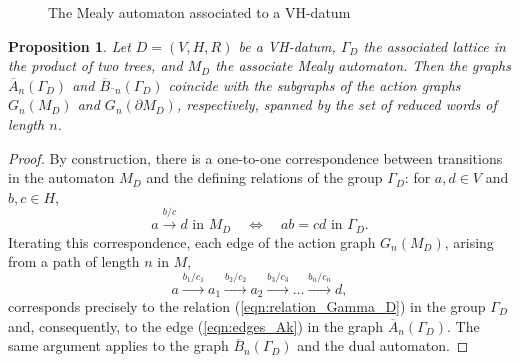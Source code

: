 \documentclass[12pt]{article}
\newtheorem{proposition}[theorem]{Proposition}
\theoremstyle{definition}
\begin{document}
\begin{figure}[t]
\begin{center}
\end{center}
\caption{The Mealy automaton associated to a VH-datum}\label{fig:Mealy_VHdatum}
\end{figure}

\begin{proposition}
Let $D=(V,H,R)$ be a VH-datum, $\Gamma_D$ the associated lattice in the product of two trees, and $M_D$ the associate Mealy automaton.
Then the graphs $\overline{A}_n(\Gamma_D)$ and $\overline{B}\overline{}_n(\Gamma_D)$ coincide with the subgraphs of the action graphs $G_n(M_D)$ and $G_n(\partial M_D)$, respectively, spanned by the set of reduced words of length $n$.
\end{proposition}
\begin{proof}
By construction, there is a one-to-one correspondence between transitions in the automaton $M_D$ and the defining relations of the group $\Gamma_D$: for $a,d\in V$ and $b,c\in H$,
\[
a\xrightarrow{b/c} d \mbox{ in $M_D$} \quad \Leftrightarrow \quad ab=cd \mbox{ in $\Gamma_D$}.
\]
Iterating this correspondence, each edge of the action graph $G_n(M_D)$, arising from a path of length $n$ in $M$,
\begin{equation*}
a\xrightarrow{b_1/c_1}a_1\xrightarrow{b_2/c_2}a_2\xrightarrow{b_3/c_3}\ldots\xrightarrow{b_n/c_n}d,
\end{equation*}
corresponds precisely to the relation (\ref{eqn:relation_Gamma_D}) in the group $\Gamma_D$ and, consequently, to the edge (\ref{eqn:edges_Ak}) in the graph $\overline{A}_n(\Gamma_D)$. The same argument applies to the graph $\overline{B}_n(\Gamma_D)$ and the dual automaton.
\end{proof}
\end{document}
